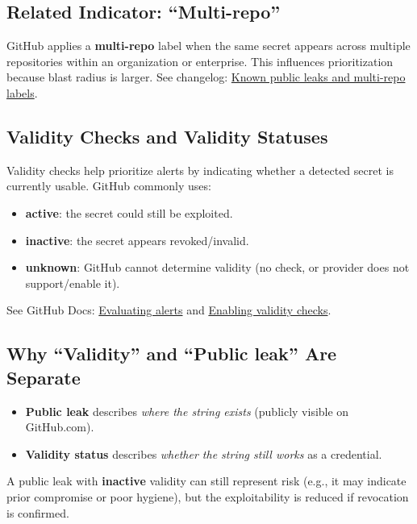 \documentclass[11pt]{article}
\newcommand{\term}[1]{\textbf{#1}}
\begin{document}
\subsection{Related Indicator: ``Multi-repo''}
GitHub applies a \term{multi-repo} label when the same secret appears across multiple repositories within an organization or enterprise. This influences prioritization because blast radius is larger. See changelog: \href{https://github.blog/changelog/2024-09-19-secret-scanning-indicates-known-public-leaks-and-duplicate-alerts-for-private-exposures-public-beta/}{Known public leaks and multi-repo labels}.

\subsection{Validity Checks and Validity Statuses}
Validity checks help prioritize alerts by indicating whether a detected secret is currently usable. GitHub commonly uses:
\begin{itemize}
  \item \term{active}: the secret could still be exploited.
  \item \term{inactive}: the secret appears revoked/invalid.
  \item \term{unknown}: GitHub cannot determine validity (no check, or provider does not support/enable it).
\end{itemize}
See GitHub Docs: \href{https://docs.github.com/code-security/secret-scanning/managing-alerts-from-secret-scanning/evaluating-alerts}{Evaluating alerts} and \href{https://docs.github.com/en/enterprise-cloud@latest/code-security/how-tos/secure-your-secrets/customize-leak-detection/enabling-validity-checks-for-your-repository}{Enabling validity checks}.

\subsection{Why ``Validity'' and ``Public leak'' Are Separate}
\begin{itemize}
  \item \term{Public leak} describes \emph{where the string exists} (publicly visible on GitHub.com).
  \item \term{Validity status} describes \emph{whether the string still works} as a credential.
\end{itemize}
A public leak with \term{inactive} validity can still represent risk (e.g., it may indicate prior compromise or poor hygiene), but the exploitability is reduced if revocation is confirmed.
\end{document}
